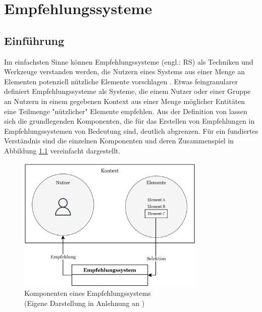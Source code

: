
\chapter{Empfehlungssysteme}
\label{ch:empfehlungssysteme}

\section{Einführung}
\label{ch:empfehlungssysteme:einführung}
Im einfachsten Sinne können Empfehlungssysteme (engl.: \ac{RS}) als Techniken und Werkzeuge verstanden werden, die Nutzern eines Systems aus einer Menge an Elementen potenziell nützliche Elemente vorschlagen \cite[S. 10]{ricci:inbook}.
Etwas feingranularer definiert \textcite[S. 1]{klahold:book} Empfehlungssysteme als Systeme, die einem Nutzer oder einer Gruppe an Nutzern in einem gegebenen Kontext aus einer Menge möglicher Entitäten eine Teilmenge "nützlicher" Elemente empfehlen.
Aus der Definition von \textcite[S. 1]{klahold:book} lassen sich die grundlegenden Komponenten, die für das Erstellen von Empfehlungen in Empfehlungssystemen von Bedeutung sind, deutlich abgrenzen.
Für ein fundiertes Verständnis sind die einzelnen Komponenten und deren Zusammenspiel in Abbildung \ref{fig:empfehlungssysteme:einführung:abb1} vereinfacht dargestellt.

\begin{figure}[H]
    \centering
	\includegraphics[width=0.8\textwidth]{gfx/komponenten-empfehlungssystem.png}
	\caption[Komponenten eines Empfehlungssystems]{Komponenten eines Empfehlungssystems\\
	(Eigene Darstellung in Anlehnung an \cite[S. 2]{klahold:book})}
	\label{fig:empfehlungssysteme:einführung:abb1}
\end{figure}

